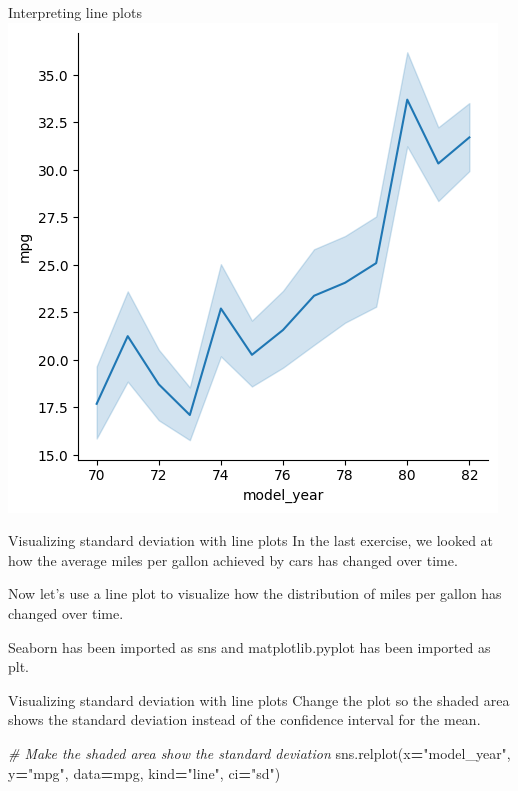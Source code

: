 \documentclass[
  ignorenonframetext,
]{beamer}
\newenvironment{Shaded}{\begin{snugshade}}{\end{snugshade}}
\newcommand{\CommentTok}[1]{\textcolor[rgb]{0.56,0.35,0.01}{\textit{#1}}}
\newcommand{\NormalTok}[1]{#1}
\newcommand{\OperatorTok}[1]{\textcolor[rgb]{0.81,0.36,0.00}{\textbf{#1}}}
\newcommand{\StringTok}[1]{\textcolor[rgb]{0.31,0.60,0.02}{#1}}
\begin{document}
\begin{frame}{Interpreting line plots}
\label{interpreting-line-plots-2}
\includegraphics{../images/im271.png}
\end{frame}

\begin{frame}{Visualizing standard deviation with line plots}
\label{visualizing-standard-deviation-with-line-plots}
In the last exercise, we looked at how the average miles per gallon
achieved by cars has changed over time.

Now let's use a line plot to visualize how the distribution of miles per
gallon has changed over time.

Seaborn has been imported as sns and matplotlib.pyplot has been imported
as plt.
\end{frame}

\begin{frame}[fragile]{Visualizing standard deviation with line plots}
\label{visualizing-standard-deviation-with-line-plots-1}
Change the plot so the shaded area shows the standard deviation instead
of the confidence interval for the mean.


\begin{Shaded}
\begin{Highlighting}[]
\CommentTok{\# Make the shaded area show the standard deviation}
\NormalTok{sns.relplot(x}\OperatorTok{=}\StringTok{"model\_year"}\NormalTok{, y}\OperatorTok{=}\StringTok{"mpg"}\NormalTok{,}
\NormalTok{            data}\OperatorTok{=}\NormalTok{mpg, kind}\OperatorTok{=}\StringTok{"line"}\NormalTok{,}
\NormalTok{            ci}\OperatorTok{=}\StringTok{"sd"}\NormalTok{)}
\end{Highlighting}
\end{Shaded}
\end{frame}
\end{document}
